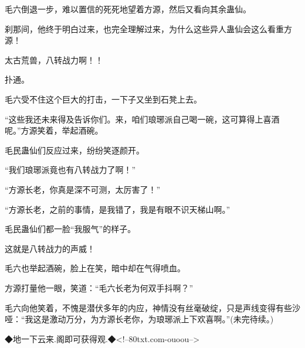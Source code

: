 \begin{this_body}
毛六倒退一步，难以置信的死死地望着方源，然后又看向其余蛊仙。

刹那间，他终于明白过来，也完全理解过来，为什么这些异人蛊仙会这么看重方源！

太古荒兽，八转战力啊！！

扑通。

毛六受不住这个巨大的打击，一下子又坐到石凳上去。

“这些我还未来得及告诉你们。来，咱们琅琊派自己喝一碗，这可算得上喜酒呢。”方源笑着，举起酒碗。

毛民蛊仙们反应过来，纷纷笑逐颜开。

“我们琅琊派竟也有八转战力了啊！”

“方源长老，你真是深不可测，太厉害了！”

“方源长老，之前的事情，是我错了，我是有眼不识天梯山啊。”

毛民蛊仙们都一脸“我服气”的样子。

这就是八转战力的声威！

毛六也举起酒碗，脸上在笑，暗中却在气得喷血。

方源打量他一眼，笑道：“毛六长老为何双手抖啊？”

毛六向他笑着，不愧是潜伏多年的内应，神情没有丝毫破绽，只是声线变得有些沙哑：“我这是激动万分，为方源长老你，为琅琊派上下欢喜啊。”(未完待续。)

◆地一下云来.阁即可获得观.◆<!--80txt.com-ouoou-->

\end{this_body}

